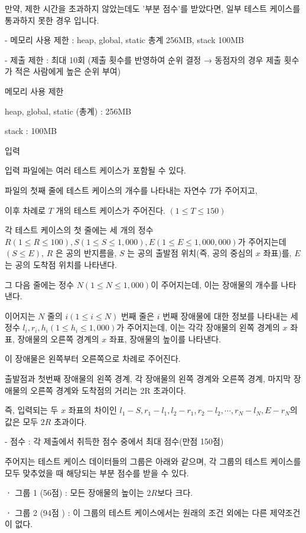 \documentclass [12pt] {oblivoir}
\begin{document}
만약, 제한 시간을 초과하지 않았는데도 '부분 점수'를 받았다면, 일부 테스트 케이스를 통과하지 못한 경우 입니다.

- 메모리 사용 제한 : heap, global, static 총계 256MB, stack 100MB

- 제출 제한 : 최대 10회 (제출 횟수를 반영하여 순위 결정 → 동점자의 경우 제출 횟수가 적은 사람에게 높은 순위 부여)

메모리 사용 제한

heap, global, static (총계) : 256MB

stack : 100MB

입력

입력 파일에는 여러 테스트 케이스가 포함될 수 있다.

파일의 첫째 줄에 테스트 케이스의 개수를 나타내는 자연수 $T$가 주어지고,

이후 차례로 $T$ 개의 테스트 케이스가 주어진다. $(1 \le T \le 150)$


각 테스트 케이스의 첫 줄에는 세 개의 정수 $R (1 \le R \le 100) , S (1 \le S \le 1,000), E (1 \le E \le 1,000,000)$가 주어지는데$(S \le E)$, $R$ 은 공의 반지름을, $S$ 는 공의 출발점 위치(즉, 공의 중심의 $x$ 좌표)를, $E$ 는 공의 도착점 위치를 나타낸다.

그 다음 줄에는 정수 $N (1 \le N \le 1,000)$이 주어지는데, 이는 장애물의 개수를 나타낸다.

이어지는 $N$ 줄의 $i (1 \le i \le N)$ 번째 줄은 $i$ 번째 장애물에 대한 정보를 나타내는 세 정수 $l_{i}, r_{i}, h_{i} (1 \le h_{i} \le 1,000)$가 주어지는데, 이는 각각 장애물의 왼쪽 경계의 $x$ 좌표, 장애물의 오른쪽 경계의 $x$ 좌표, 장애물의 높이를 나타낸다.

이 장애물은 왼쪽부터 오른쪽으로 차례로 주어진다.

출발점과 첫번째 장애물의 왼쪽 경계, 각 장애물의 왼쪽 경계와 오른쪽 경계, 마지막 장애물의 오른쪽 경계와 도착점의 거리는 2R 초과이다.

즉, 입력되는 두 $x$ 좌표의 차이인 $l_{1} - S, r_{1} - l_{1}, l_{2} - r_{1}, r_{2} - l_{2}, \cdots, r_{N} - l_{N}, E - r_{N}$의 값은 모두 $2R$ 초과이다.

- 점수 : 각 제출에서 취득한 점수 중에서 최대 점수(만점 150점)

주어지는 테스트 케이스 데이터들의 그룹은 아래와 같으며, 각 그룹의 테스트 케이스를 모두 맞추었을 때 해당되는 부분 점수를 받을 수 있다.

ㆍ 그룹 1 (56점) : 모든 장애물의 높이는 $2R$보다 크다.

ㆍ 그룹 2 (94점 ) : 이 그룹의 테스트 케이스에서는 원래의 조건 외에는 다른 제약조건이 없다.
\end{document}
